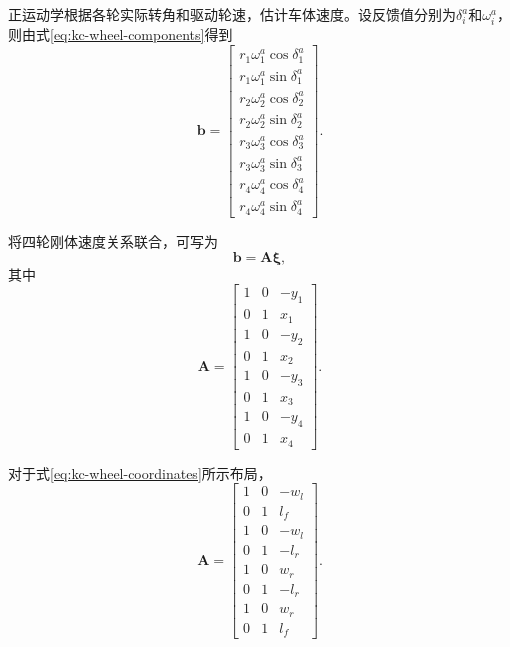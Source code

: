 \documentclass[UTF8,12pt,a4paper,openany]{ctexbook}
\begin{document}
正运动学根据各轮实际转角和驱动轮速，估计车体速度。设反馈值分别为$\delta_i^{a}$和$\omega_i^{a}$，则由式\eqref{eq:kc-wheel-components}得到
\begin{equation}
    \boldsymbol{b}
    =
    \begin{bmatrix}
        r_1\omega_1^{a}\cos\delta_1^{a}\\
        r_1\omega_1^{a}\sin\delta_1^{a}\\
        r_2\omega_2^{a}\cos\delta_2^{a}\\
        r_2\omega_2^{a}\sin\delta_2^{a}\\
        r_3\omega_3^{a}\cos\delta_3^{a}\\
        r_3\omega_3^{a}\sin\delta_3^{a}\\
        r_4\omega_4^{a}\cos\delta_4^{a}\\
        r_4\omega_4^{a}\sin\delta_4^{a}
    \end{bmatrix}.
    \label{eq:kc-feedback-vector}
\end{equation}

将四轮刚体速度关系联合，可写为
\begin{equation}
    \boldsymbol{b}
    =
    \boldsymbol{A}\boldsymbol{\xi},
    \label{eq:kc-forward-system}
\end{equation}
其中
\begin{equation}
    \boldsymbol{A}
    =
    \begin{bmatrix}
        1&0&-y_1\\
        0&1&x_1\\
        1&0&-y_2\\
        0&1&x_2\\
        1&0&-y_3\\
        0&1&x_3\\
        1&0&-y_4\\
        0&1&x_4
    \end{bmatrix}.
    \label{eq:kc-geometry-matrix}
\end{equation}

对于式\eqref{eq:kc-wheel-coordinates}所示布局，
\begin{equation}
    \boldsymbol{A}
    =
    \begin{bmatrix}
        1&0&-w_l\\
        0&1&l_f\\
        1&0&-w_l\\
        0&1&-l_r\\
        1&0&w_r\\
        0&1&-l_r\\
        1&0&w_r\\
        0&1&l_f
    \end{bmatrix}.
    \label{eq:kc-asymmetric-matrix}
\end{equation}
\end{document}
